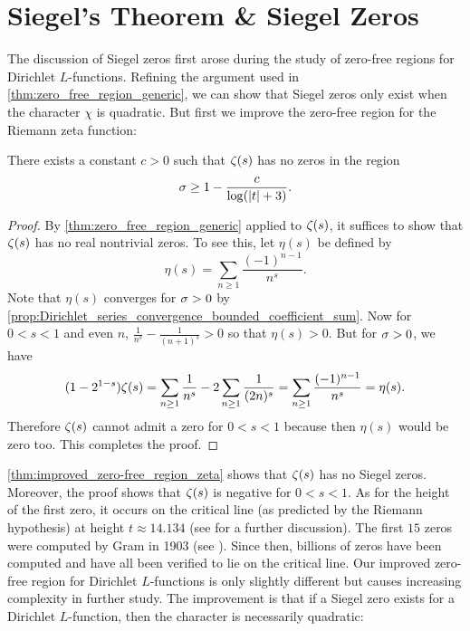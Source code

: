   \section{Siegel's Theorem \& Siegel Zeros}
    The discussion of Siegel zeros first arose during the study of zero-free regions for Dirichlet $L$-functions. Refining the argument used in \cref{thm:zero_free_region_generic}, we can show that Siegel zeros only exist when the character $\chi$ is quadratic. But first we improve the zero-free region for the Riemann zeta function:

    \begin{theorem}\label{thm:improved_zero-free_region_zeta}
      There exists a constant $c > 0$ such that $\zeta(s)$ has no zeros in the region
      \[
        \sigma \ge 1-\frac{c}{\log(|t|+3)}.
      \]
    \end{theorem}
    \begin{proof}
      By \cref{thm:zero_free_region_generic} applied to $\zeta(s)$, it suffices to show that $\zeta(s)$ has no real nontrivial zeros. To see this, let $\eta(s)$ be defined by
      \[
        \eta(s) = \sum_{n \ge 1}\frac{(-1)^{n-1}}{n^{s}}.
      \]
      Note that $\eta(s)$ converges for $\sigma > 0$ by \cref{prop:Dirichlet_series_convergence_bounded_coefficient_sum}. Now for $0 < s < 1$ and even $n$, $\frac{1}{n^{s}}-\frac{1}{(n+1)^{s}} > 0$ so that $\eta(s) > 0$. But for $\sigma > 0$, we have
      \[
        (1-2^{1-s})\zeta(s) = \sum_{n \ge 1}\frac{1}{n^{s}}-2\sum_{n \ge 1}\frac{1}{(2n)^{s}} = \sum_{n \ge 1}\frac{(-1)^{n-1}}{n^{s}} = \eta(s).
      \]
      Therefore $\zeta(s)$ cannot admit a zero for $0 < s < 1$ because then $\eta(s)$ would be zero too. This completes the proof.
    \end{proof}

    \cref{thm:improved_zero-free_region_zeta} shows that $\zeta(s)$ has no Siegel zeros. Moreover, the proof shows that $\zeta(s)$ is negative for $0 < s < 1$. As for the height of the first zero, it occurs on the critical line (as predicted by the Riemann hypothesis) at height $t \approx 14.134$ (see \cite{davenport1980multiplicative} for a further discussion). The first $15$ zeros were computed by Gram in 1903 (see \cite{gram1903note}). Since then, billions of zeros have been computed and have all been verified to lie on the critical line. Our improved zero-free region for Dirichlet $L$-functions is only slightly different but causes increasing complexity in further study. The improvement is that if a Siegel zero exists for a Dirichlet $L$-function, then the character is necessarily quadratic:

